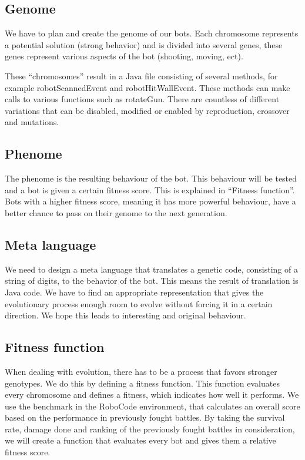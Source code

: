 \documentclass[a4paper,10pt]{article}
\begin{document}
\subsection{Genome}
We have to plan and create the genome of our bots. Each chromosome represents a potential solution (strong behavior) and is divided into several genes, these genes represent various aspects of the bot (shooting, moving, ect).

These ``chromosomes'' result in a Java file consisting of several methods, for example robotScannedEvent and robotHitWallEvent. These methods can make calls to various functions such as rotateGun. There are countless of different variations that can be disabled, modified or enabled by reproduction, crossover and mutations.

\subsection{Phenome}
The phenome is the resulting behaviour of the bot. This behaviour will be tested and a bot is given a certain fitness score. This is explained in ``Fitness function''. Bots with a higher fitness score, meaning it has more powerful behaviour, have a better chance to pass on their genome to the next generation.

\subsection{Meta language}
We need to design a meta language that translates a genetic code, consisting of a string of digits, to the behavior of the bot. This means the result of translation is Java code. We have to find an appropriate representation that gives the evolutionary process enough room to evolve without forcing it in a certain direction. We hope this leads to interesting and original behaviour.

\subsection{Fitness function}
When dealing with evolution, there has to be a process that favors stronger genotypes. We do this by defining a fitness function. This function evaluates every chromosome and defines a fitness, which indicates how well it performs.
We use the benchmark in the RoboCode environment, that calculates an overall score based on the performance in previously fought battles. By taking the survival rate, damage done and ranking of the previously fought battles in consideration, we will create a function that evaluates every bot and gives them a relative fitness score.
\end{document}
